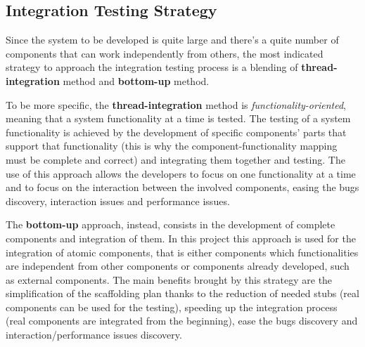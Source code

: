 \subsection{Integration Testing Strategy}
\label{sec:integration-testing-strategy}

Since the system to be developed is quite large and there's a quite number of components that can work independently from others, the most indicated strategy to approach the integration testing process is a blending of \textbf{thread-integration} method and \textbf{bottom-up} method.

To be more specific, the \textbf{thread-integration} method is \textit{functionality-oriented}, meaning that a system functionality at a time is tested. The testing of a system functionality is achieved by the development of specific components' parts that support that functionality (this is why the component-functionality mapping must be complete and correct) and integrating them together and testing. The use of this approach allows the developers to focus on one functionality at a time and to focus on the interaction between the involved components, easing the bugs discovery, interaction issues and performance issues.

The \textbf{bottom-up} approach, instead, consists in the development of complete components and integration of them. In this project this approach is used for the integration of atomic components, that is either components which functionalities are independent from other components or components already developed, such as external components. The main benefits brought by this strategy are the simplification of the scaffolding plan thanks to the reduction of needed stubs (real components can be used for the testing), speeding up the integration process (real components are integrated from the beginning), ease the bugs discovery and interaction/performance issues discovery.
